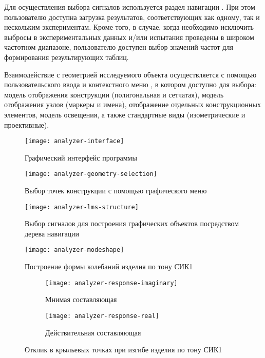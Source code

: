 Для осуществления выбора сигналов используется раздел навигации  . При этом пользователю доступна загрузка результатов, соответствующих как одному, так и нескольким экспериментам. Кроме того, в случае, когда необходимо исключить выбросы в экспериментальных данных и/или испытания проведены в широком частотном диапазоне, пользователю доступен выбор значений частот для формирования результирующих таблиц.

Взаимодействие с геометрией исследуемого объекта осуществляется с помощью пользовательского ввода и контекстного меню , в котором доступно для выбора: модель отображения конструкции (полигональная и сетчатая), модель отображения узлов (маркеры и имена), отображение отдельных конструкционных элементов, модель освещения, а также стандартные виды (изометрические и проективные).

\begin{figure}[H]
	\centerfloat
	\texttt{[image: analyzer-interface]}
	\caption{Графический интерфейс программы} \label{fig:analyzer-interface}
\end{figure}

\begin{figure}[H]
	\centerfloat
	\texttt{[image: analyzer-geometry-selection]}
	\caption{Выбор точек конструкции с помощью графического меню} \label{fig:analyzer-geometry-selection}
\end{figure}

\begin{figure}[H]
	\centerfloat
	\texttt{[image: analyzer-lms-structure]}
	\caption{Выбор сигналов для построения графических объектов посредством дерева навигации } \label{fig:analyzer-lms-structure}
\end{figure}

\begin{figure}[H]
	\centerfloat
	\texttt{[image: analyzer-modeshape]}
	\caption{Построение формы колебаний изделия по тону СИК1} \label{fig:analyzer-modeshape}
\end{figure}

\begin{figure}[H]
	\centering
	\begin{subfigure}{0.49\textwidth}
		\texttt{[image: analyzer-response-imaginary]}
		\caption{Мнимая составляющая}
	\end{subfigure}
	\hfill
	\begin{subfigure}{0.49\textwidth}
		\texttt{[image: analyzer-response-real]}
		\caption{Действительная составляющая}
	\end{subfigure}
     \caption{Отклик в крыльевых точках при изгибе изделия по тону СИК1} \label{fig:analyzer-response}
\end{figure}

